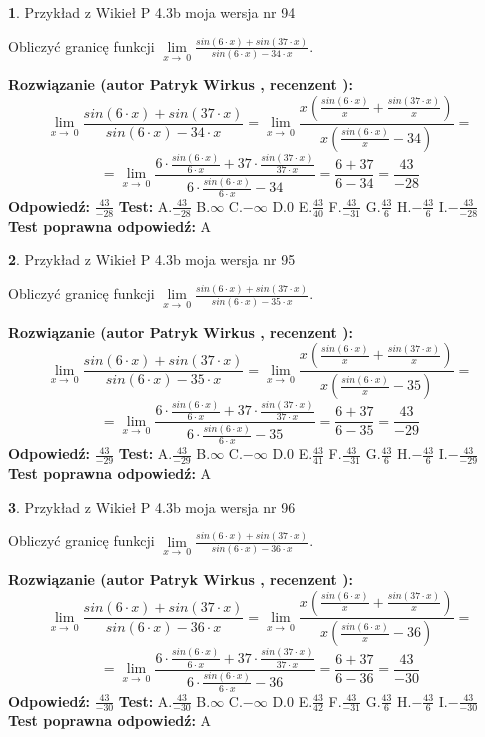 \documentclass[12pt, a4paper]{article}
\theoremstyle{definition} %
\newtheorem{zad}{}
\newcommand{\zadStart}[1]{\begin{zad}#1\newline}
\newcommand{\zadStop}{\end{zad}}
\newcommand{\rozwStart}[2]{\noindent \textbf{Rozwiązanie (autor #1 , recenzent #2): }\newline}
\newcommand{\rozwStop}{\newline}
\newcommand{\odpStart}{\noindent \textbf{Odpowiedź:}\newline}
\newcommand{\odpStop}{\newline}
\newcommand{\testStart}{\noindent \textbf{Test:}\newline}
\newcommand{\testStop}{\newline}
\newcommand{\kluczStart}{\noindent \textbf{Test poprawna odpowiedź:}\newline}
\newcommand{\kluczStop}{\newline}
\begin{document}
\zadStart{Przykład z Wikieł P 4.3b moja wersja nr 94}


Obliczyć granicę funkcji $\lim\limits_{x\to\ 0}\frac{sin(6 \cdot x)+sin(37 \cdot x)}{sin(6 \cdot x)-34 \cdot x}$.
\zadStop
\rozwStart{Patryk Wirkus}{}
$$\lim\limits_{x\to\ 0}\frac{sin(6 \cdot x)+sin(37 \cdot x)}{sin(6 \cdot x)-34 \cdot x}=\lim\limits_{x\to\ 0}\frac{x(\frac{sin(6 \cdot x)}{x}+\frac{sin(37 \cdot x)}{x})}{x(\frac{sin(6 \cdot x)}{x}-34)}=$$
$$=\lim\limits_{x\to\ 0}\frac{6 \cdot \frac{sin(6 \cdot x)}{6 \cdot x}+37 \cdot \frac{sin(37 \cdot x)}{37 \cdot x}}{6 \cdot \frac{sin(6 \cdot x)}{6 \cdot x}-34}=\frac{6+37}{6-34} = \frac{43}{-28}$$
\rozwStop
\odpStart
$\frac{43}{-28}$
\odpStop
\testStart
A.$\frac{43}{-28}$
B.$\infty$
C.$-\infty$
D.$0$
E.$\frac{43}{40}$
F.$\frac{43}{-31}$
G.$\frac{43}{6}$
H.$-\frac{43}{6}$
I.$-\frac{43}{-28}$
\testStop
\kluczStart
A
\kluczStop



\zadStart{Przykład z Wikieł P 4.3b moja wersja nr 95}


Obliczyć granicę funkcji $\lim\limits_{x\to\ 0}\frac{sin(6 \cdot x)+sin(37 \cdot x)}{sin(6 \cdot x)-35 \cdot x}$.
\zadStop
\rozwStart{Patryk Wirkus}{}
$$\lim\limits_{x\to\ 0}\frac{sin(6 \cdot x)+sin(37 \cdot x)}{sin(6 \cdot x)-35 \cdot x}=\lim\limits_{x\to\ 0}\frac{x(\frac{sin(6 \cdot x)}{x}+\frac{sin(37 \cdot x)}{x})}{x(\frac{sin(6 \cdot x)}{x}-35)}=$$
$$=\lim\limits_{x\to\ 0}\frac{6 \cdot \frac{sin(6 \cdot x)}{6 \cdot x}+37 \cdot \frac{sin(37 \cdot x)}{37 \cdot x}}{6 \cdot \frac{sin(6 \cdot x)}{6 \cdot x}-35}=\frac{6+37}{6-35} = \frac{43}{-29}$$
\rozwStop
\odpStart
$\frac{43}{-29}$
\odpStop
\testStart
A.$\frac{43}{-29}$
B.$\infty$
C.$-\infty$
D.$0$
E.$\frac{43}{41}$
F.$\frac{43}{-31}$
G.$\frac{43}{6}$
H.$-\frac{43}{6}$
I.$-\frac{43}{-29}$
\testStop
\kluczStart
A
\kluczStop



\zadStart{Przykład z Wikieł P 4.3b moja wersja nr 96}


Obliczyć granicę funkcji $\lim\limits_{x\to\ 0}\frac{sin(6 \cdot x)+sin(37 \cdot x)}{sin(6 \cdot x)-36 \cdot x}$.
\zadStop
\rozwStart{Patryk Wirkus}{}
$$\lim\limits_{x\to\ 0}\frac{sin(6 \cdot x)+sin(37 \cdot x)}{sin(6 \cdot x)-36 \cdot x}=\lim\limits_{x\to\ 0}\frac{x(\frac{sin(6 \cdot x)}{x}+\frac{sin(37 \cdot x)}{x})}{x(\frac{sin(6 \cdot x)}{x}-36)}=$$
$$=\lim\limits_{x\to\ 0}\frac{6 \cdot \frac{sin(6 \cdot x)}{6 \cdot x}+37 \cdot \frac{sin(37 \cdot x)}{37 \cdot x}}{6 \cdot \frac{sin(6 \cdot x)}{6 \cdot x}-36}=\frac{6+37}{6-36} = \frac{43}{-30}$$
\rozwStop
\odpStart
$\frac{43}{-30}$
\odpStop
\testStart
A.$\frac{43}{-30}$
B.$\infty$
C.$-\infty$
D.$0$
E.$\frac{43}{42}$
F.$\frac{43}{-31}$
G.$\frac{43}{6}$
H.$-\frac{43}{6}$
I.$-\frac{43}{-30}$
\testStop
\kluczStart
A
\kluczStop
\end{document}
